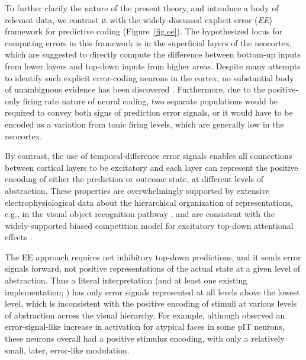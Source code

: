 \documentclass[11pt,twoside]{article}
\newif\myifpdf
\begin{document}
To further clarify the nature of the present theory, and introduce a body of relevant data, we contrast it with the widely-discussed explicit error (\emph{EE}) framework for predictive coding \citep{RaoBallard99,KawatoHayakawaInui93,Friston05,Friston10,OudenKokLange12,BastosUsreyAdamsEtAl12,LotterKreimanCox16} (Figure~\ref{fig.ee}).  The hypothesized locus for computing errors in this framework is in the superficial layers of the neocortex, which are suggested to directly compute the difference between bottom-up inputs from lower layers and top-down inputs from higher areas.  Despite many attempts to identify such explicit error-coding neurons in the cortex, no substantial body of unambiguous evidence has been discovered \citep{KokLange15,KokJeheedeLange12,SummerfieldEgner09,LeeMumford03,WalshMcGovernClarkEtAl20}.  Furthermore, due to the positive-only firing rate nature of neural coding, two separate populations would be required to convey both signs of prediction error signals, or it would have to be encoded as a variation from tonic firing levels, which are generally low in the neocortex.

By contrast, the use of temporal-difference error signals enables all connections between cortical layers to be excitatory and each layer can represent the positive encoding of either the prediction or outcome state, at different levels of abstraction.  These properties are overwhelmingly supported by extensive electrophysiological data about the hierarchical organization of representations, e.g., in the visual object recognition pathway \citep{KobatakeTanaka94,VanRullenThorpe02,CadieuHongYaminsEtAl14}, and are consistent with the widely-supported biased competition model for excitatory top-down attentional effects \citep{DesimoneDuncan95,ReynoldsChelazziDesimone99,MillerCohen01,OReillyWyatteHerdEtAl13}.

The EE approach requires net inhibitory top-down predictions, and it sends error signals forward, not positive representations of the actual state at a given level of abstraction.  Thus a literal interpretation (and at least one existing implementation; \citealp{LotterKreimanCox16}) has only error signals represented at all levels above the lowest level, which is inconsistent with the positive encoding of stimuli at various levels of abstraction across the visual hierarchy.  For example, although \citet{IssaCadieuDiCarlo18} observed an error-signal-like increase in activation for atypical faces in some pIT neurons, these neurons overall had a positive stimulus encoding, with only a relatively small, later, error-like modulation.
\end{document}
